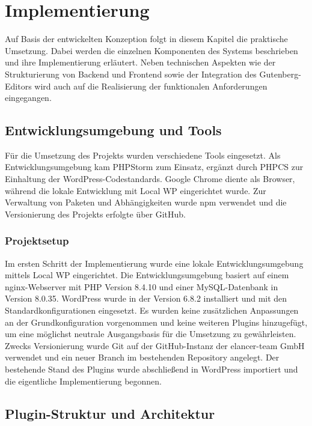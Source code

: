 \chapter{Implementierung}
\label{chap:implementation}

Auf Basis der entwickelten Konzeption folgt in diesem Kapitel die praktische Umsetzung.
Dabei werden die einzelnen Komponenten des Systems beschrieben und ihre Implementierung erläutert.
Neben technischen Aspekten wie der Strukturierung von Backend und Frontend sowie der Integration des Gutenberg-Editors wird auch auf die Realisierung der funktionalen Anforderungen eingegangen.

\section{Entwicklungsumgebung und Tools}

Für die Umsetzung des Projekts wurden verschiedene Tools eingesetzt.
Als Entwicklungsumgebung kam PHPStorm zum Einsatz, ergänzt durch PHPCS zur Einhaltung der WordPress-Codestandards.
Google Chrome diente als Browser, während die lokale Entwicklung mit Local WP eingerichtet wurde.
Zur Verwaltung von Paketen und Abhängigkeiten wurde npm verwendet und die Versionierung des Projekts erfolgte über GitHub.

\subsection{Projektsetup}

Im ersten Schritt der Implementierung wurde eine lokale Entwicklungsumgebung mittels Local WP eingerichtet.
Die Entwicklungsumgebung basiert auf einem nginx-Webserver mit PHP Version 8.4.10 und einer MySQL-Datenbank in Version 8.0.35.
WordPress wurde in der Version 6.8.2 installiert und mit den Standardkonfigurationen eingesetzt.
Es wurden keine zusätzlichen Anpassungen an der Grundkonfiguration vorgenommen und keine weiteren Plugins hinzugefügt, um eine möglichst neutrale Ausgangsbasis für die Umsetzung zu gewährleisten.
Zwecks Versionierung wurde Git auf der GitHub-Instanz der elancer-team GmbH verwendet und ein neuer Branch im bestehenden Repository angelegt.
Der bestehende Stand des Plugins wurde abschließend in WordPress importiert und die eigentliche Implementierung begonnen.

\section{Plugin-Struktur und Architektur}

